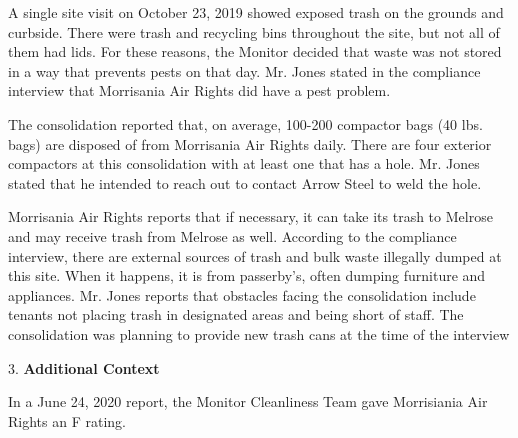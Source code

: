 A single site visit on October 23, 2019 showed exposed trash on the grounds and curbside. There were trash and recycling bins throughout the site, but not all of them had lids. For these reasons, the Monitor decided that waste was not stored in a way that prevents pests on that day. Mr. Jones stated in the compliance interview that Morrisania Air Rights did have a pest problem.

The consolidation reported that, on average, 100-200 compactor bags (40 lbs. bags) are disposed of from Morrisania Air Rights daily. There are four exterior compactors at this consolidation with at least one that has a hole. Mr. Jones stated that he intended to reach out to contact Arrow Steel to weld the hole.

Morrisania Air Rights reports that if necessary, it can take its trash to Melrose and may receive trash from Melrose as well. According to the compliance interview, there are external sources of trash and bulk waste illegally dumped at this site. When it happens, it is from passerby's, often dumping furniture and appliances. Mr. Jones reports that obstacles facing the consolidation include tenants not placing trash in designated areas and being short of staff. The consolidation was planning to provide new trash cans at the time of the interview

3. \textbf{Additional Context}

In a June 24, 2020 report, the Monitor Cleanliness Team gave Morrisiania Air Rights an F rating. 